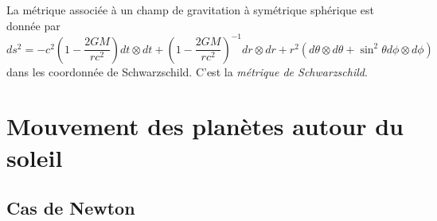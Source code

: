 \documentclass[a4paper,11pt]{report}
\begin{document}
        \begin{prop}\begin{leftbar}
            La métrique associée à un champ de gravitation à symétrique sphérique est donnée par
            \begin{equation}
                ds^2 = -c^2\left( 1-\frac{2GM}{rc^2} \right)dt\otimes dt + \left( 1-\frac{2GM}{rc^2} \right)^{-1}dr\otimes dr + r^2(d\theta\otimes d\theta+\sin^2\theta d\phi\otimes d\phi)
            \end{equation}
            dans les coordonnée de Schwarzschild. C'est la \textit{métrique de Schwarzschild}.
        \end{leftbar}\end{prop}

    \section{Mouvement des planètes autour du soleil}
    
        \subsection{Cas de Newton}
        
\end{document}
